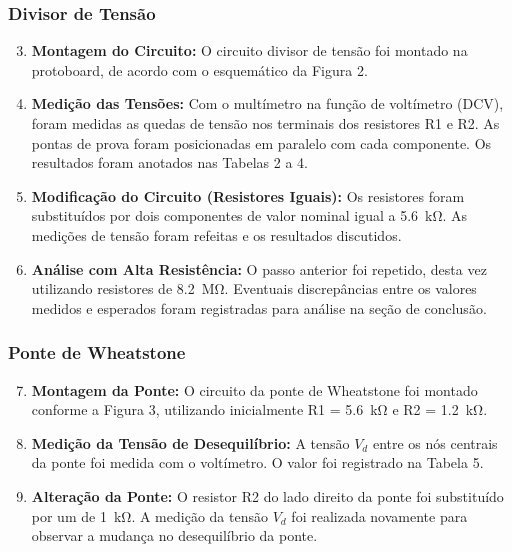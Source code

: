 \documentclass[a4paper, 12pt]{article}
\begin{document}
\subsubsection{Divisor de Tensão}
\begin{enumerate}
\setcounter{enumi}{2} %
\item \textbf{Montagem do Circuito:} O circuito divisor de tensão foi montado na protoboard, de acordo com o esquemático da Figura 2.

\item \textbf{Medição das Tensões:} Com o multímetro na função de voltímetro (DCV), foram medidas as quedas de tensão nos terminais dos resistores R1 e R2. As pontas de prova foram posicionadas em paralelo com cada componente. Os resultados foram anotados nas Tabelas 2 a 4.

\item \textbf{Modificação do Circuito (Resistores Iguais):} Os resistores foram substituídos por dois componentes de valor nominal igual a \SI{5,6}{\kilo\ohm}. As medições de tensão foram refeitas e os resultados discutidos.

\item \textbf{Análise com Alta Resistência:} O passo anterior foi repetido, desta vez utilizando resistores de \SI{8,2}{\mega\ohm}. Eventuais discrepâncias entre os valores medidos e esperados foram registradas para análise na seção de conclusão.
\end{enumerate}

\subsubsection{Ponte de Wheatstone}
\begin{enumerate}
\setcounter{enumi}{6} %
\item \textbf{Montagem da Ponte:} O circuito da ponte de Wheatstone foi montado conforme a Figura 3, utilizando inicialmente R1 = \SI{5,6}{\kilo\ohm} e R2 = \SI{1,2}{\kilo\ohm}.

\item \textbf{Medição da Tensão de Desequilíbrio:} A tensão $V_d$ entre os nós centrais da ponte foi medida com o voltímetro. O valor foi registrado na Tabela 5.

\item \textbf{Alteração da Ponte:} O resistor R2 do lado direito da ponte foi substituído por um de \SI{1}{\kilo\ohm}. A medição da tensão $V_d$ foi realizada novamente para observar a mudança no desequilíbrio da ponte.
\end{enumerate}
\end{document}
